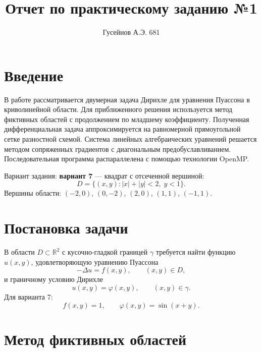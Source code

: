 \documentclass[12pt,a4paper]{article}
\title{Отчет по практическому заданию №1}
\author{Гусейнов А.Э. 681}
\begin{document}
\maketitle

\tableofcontents
\newpage

\section{Введение}

В работе рассматривается двумерная задача Дирихле для уравнения Пуассона в криволинейной области. Для приближенного решения используется метод фиктивных областей с продолжением по младшему коэффициенту. Полученная дифференциальная задача аппроксимируется на равномерной прямоугольной сетке разностной схемой. Система линейных алгебраических уравнений решается методом сопряженных градиентов с диагональным предобуславливанием. Последовательная программа распараллелена с помощью технологии OpenMP.

Вариант задания: \textbf{вариант 7} — квадрат с отсеченной вершиной:
\[
D = \{(x,y): |x|+|y|<2,\; y<1\}.
\]
Вершины области: \((-2,0)\), \((0,-2)\), \((2,0)\), \((1,1)\), \((-1,1)\).

\section{Постановка задачи}

В области \(D\subset\mathbb{R}^2\) с кусочно-гладкой границей \(\gamma\) требуется найти функцию \(u(x,y)\), удовлетворяющую уравнению Пуассона
\begin{equation}
-\Delta u = f(x,y), \qquad (x,y)\in D,
\label{eq:poisson}
\end{equation}
и граничному условию Дирихле
\begin{equation}
u(x,y) = \varphi(x,y), \qquad (x,y)\in\gamma.
\label{eq:bc}
\end{equation}
Для варианта 7:
\[
f(x,y)=1,\qquad \varphi(x,y)=\sin(x+y).
\]

\section{Метод фиктивных областей}
\end{document}
